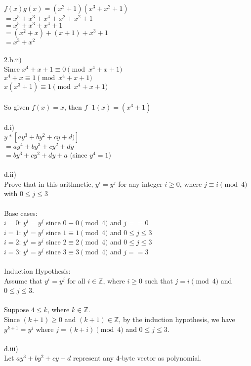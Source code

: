 \documentclass{assignment}
\begin{document}
\begin{problemlist}
\begin{problem}
\begin{answer}
$f(x)g(x)=(x^2+1)(x^3+x^2+1)$\\
$=x^5+x^3+x^4+x^2+x^2+1$\\
$=x^5+x^3+x^4+1$\\
$=(x^2+x)+(x+1)+x^3+1$\\
$=x^3+x^2$\\
\\
2.b.ii)\\
Since $x^4+x+1\equiv 0  \pmod{x^4+x+1}$\\
$x^4+x\equiv 1  \pmod{x^4+x+1}$\\
$x(x^3+1)\equiv 1  \pmod{x^4+x+1}$\\
\\
So given $f(x)=x$, then $f^-1(x)=(x^3+1)$\\
\\
d.i)\\
$y*[ay^3+by^2+cy+d)]$\\
$=ay^4+by^3+cy^2+dy$\\
$=by^3+cy^2+dy+a$ (since $y^4=1$)\\
\\
d.ii)\\
Prove that in this arithmetic, $y^i=y^j$ for any integer $i\geq 0$, where $j\equiv i \pmod 4$ with $0\leq j \leq 3$\\
\\
Base cases:\\
$i=0$: $y^i=y^j$ since $0\equiv 0 \pmod 4$ and $j == 0$\\
$i=1$: $y^i=y^j$ since $1\equiv 1 \pmod 4$ and $0 \leq j\leq 3$\\
$i=2$: $y^i=y^j$ since $2\equiv 2 \pmod 4$ and $0\leq j \leq 3$\\
$i=3$: $y^i=y^j$ since $3\equiv 3 \pmod 4$ and $j==3$\\
\\
Induction Hypothesis:\\
Assume that $y^i=y^j$ for all $i\in \mathbb{Z}$, where $i \geq 0$ such that $j=i \pmod 4$ and $0\leq j \leq 3$.\\
\\
Suppose $4 \leq k$, where $k\in \mathbb{Z}$.\\
Since $(k+1) \geq 0$ and $(k+1) \in \mathbb{Z}$, by the induction hypothesis, we have $y^{k+1}=y^j$ where $j=(k+i)\pmod 4$ and $0\leq j \leq 3$.\\ 
\\
d.iii)\\
Let $ay^3+by^2+cy+d$ represent any 4-byte vector as polynomial.\\
\\

\end{answer}
\end{problem}
\end{problemlist}
\end{document}
